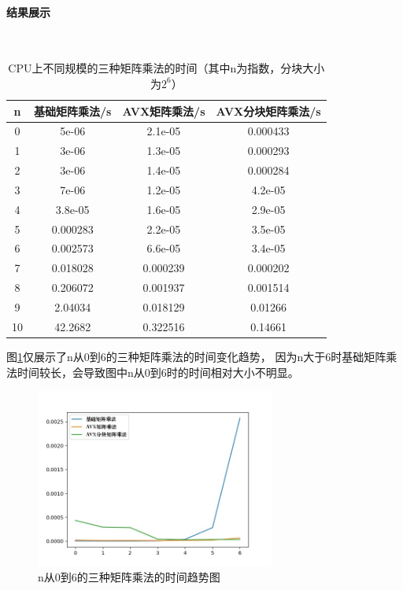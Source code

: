 \documentclass[UTF8]{article}
\begin{document}
    \paragraph{结果展示}\mbox{}\\
    \begin{table}[H]
        \centering
        \caption{CPU上不同规模的三种矩阵乘法的时间（其中n为指数，分块大小为$2^6$）}
        \begin{tabular}{cccc}
            \hline
            n & 基础矩阵乘法/s & AVX矩阵乘法/s & AVX分块矩阵乘法/s \\
            \hline
            0 & 5e-06 & 2.1e-05 & 0.000433 \\
            1 & 3e-06 & 1.3e-05 & 0.000293 \\
            2 & 3e-06 & 1.4e-05 & 0.000284 \\
            3 & 7e-06 & 1.2e-05 & 4.2e-05 \\
            4 & 3.8e-05 & 1.6e-05 & 2.9e-05 \\
            5 & 0.000283 & 2.2e-05 & 3.5e-05 \\
            6 & 0.002573 & 6.6e-05 & 3.4e-05 \\
            7 & 0.018028 & 0.000239 & 0.000202 \\
            8 & 0.206072 & 0.001937 & 0.001514 \\
            9 & 2.04034 & 0.018129 & 0.01266 \\
            10 & 42.2682 & 0.322516 & 0.14661 \\
            \hline
        \end{tabular}
    \end{table}
    图\ref{cpu part}仅展示了n从0到6的三种矩阵乘法的时间变化趋势，
    因为n大于6时基础矩阵乘法时间较长，会导致图中n从0到6时的时间相对大小不明显。
    \begin{figure}[H]
        \centering
        \includegraphics[width=0.7\textwidth]{./fig/cpu.jpg}
        \caption{n从0到6的三种矩阵乘法的时间趋势图}
        \label{cpu part}
    \end{figure}
\end{document}
